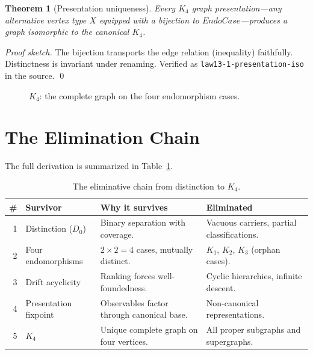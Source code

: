 \documentclass[11pt,a4paper]{article}
\newtheorem{theorem}{Theorem}[section]
\theoremstyle{definition}
\begin{document}
\begin{theorem}[Presentation uniqueness]
\label{thm:k4-unique}
Every $K_4$ graph presentation---any alternative vertex type $X$ equipped
with a bijection to $\mathit{EndoCase}$---produces a graph isomorphic to
the canonical $K_4$.
\end{theorem}

\begin{proof}[Proof sketch]
The bijection transports the edge relation (inequality) faithfully.
Distinctness is invariant under renaming.  Verified as
\texttt{law13-1-presentation-iso} in the source.
\qed
\end{proof}

\begin{figure}[h]
\centering
{}
\caption{$K_4$: the complete graph on the four endomorphism cases.}
\label{fig:k4-tetrahedron}
\end{figure}

\section{The Elimination Chain}
\label{sec:chain}

The full derivation is summarized in Table~\ref{tab:chain}.

\begin{table}[h]
\centering
\small
\renewcommand{\arraystretch}{1.3}
\begin{tabular}{@{}r l p{4.2cm} p{4.2cm}@{}}
\hline
\textbf{\#} & \textbf{Survivor} & \textbf{Why it survives} & \textbf{Eliminated} \\
\hline
1 & Distinction ($D_0$) & Binary separation with coverage. & Vacuous carriers, partial classifications. \\
2 & Four endomorphisms & $2 \times 2 = 4$ cases, mutually distinct. & $K_1$, $K_2$, $K_3$ (orphan cases). \\
3 & Drift acyclicity & Ranking forces well-foundedness. & Cyclic hierarchies, infinite descent. \\
4 & Presentation fixpoint & Observables factor through canonical base. & Non-canonical representations. \\
5 & $K_4$ & Unique complete graph on four vertices. & All proper subgraphs and supergraphs. \\
\hline
\end{tabular}
\caption{The eliminative chain from distinction to $K_4$.}
\label{tab:chain}
\end{table}
\end{document}
